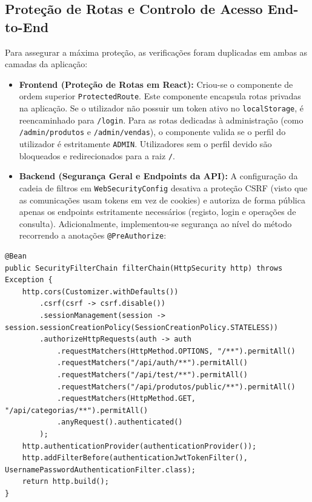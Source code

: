 \documentclass[11pt,a4paper,oneside]{report}
\begin{document}
\subsection{Proteção de Rotas e Controlo de Acesso End-to-End}
Para assegurar a máxima proteção, as verificações foram duplicadas em ambas as camadas da aplicação:
\begin{itemize}
    \item \textbf{Frontend (Proteção de Rotas em React):}
    Criou-se o componente de ordem superior \texttt{ProtectedRoute}. Este componente encapsula rotas privadas na aplicação. Se o utilizador não possuir um token ativo no \texttt{localStorage}, é reencaminhado para \texttt{/login}. 
    Para as rotas dedicadas à administração (como \texttt{/admin/produtos} e \texttt{/admin/vendas}), o componente valida se o perfil do utilizador é estritamente \texttt{ADMIN}. Utilizadores sem o perfil devido são bloqueados e redirecionados para a raiz \texttt{/}.
    
    \item \textbf{Backend (Segurança Geral e Endpoints da API):}
    A configuração da cadeia de filtros em \texttt{WebSecurityConfig} desativa a proteção CSRF (visto que as comunicações usam tokens em vez de cookies) e autoriza de forma pública apenas os endpoints estritamente necessários (registo, login e operações de consulta). Adicionalmente, implementou-se segurança ao nível do método recorrendo a anotações \texttt{@PreAuthorize}:
\end{itemize}

\begin{lstlisting}[caption={Configuração do SecurityFilterChain no Backend (WebSecurityConfig)}]
@Bean
public SecurityFilterChain filterChain(HttpSecurity http) throws Exception {
    http.cors(Customizer.withDefaults())
        .csrf(csrf -> csrf.disable())
        .sessionManagement(session -> session.sessionCreationPolicy(SessionCreationPolicy.STATELESS))
        .authorizeHttpRequests(auth -> auth
            .requestMatchers(HttpMethod.OPTIONS, "/**").permitAll()
            .requestMatchers("/api/auth/**").permitAll()
            .requestMatchers("/api/test/**").permitAll()
            .requestMatchers("/api/produtos/public/**").permitAll()
            .requestMatchers(HttpMethod.GET, "/api/categorias/**").permitAll()
            .anyRequest().authenticated()
        );
    http.authenticationProvider(authenticationProvider());
    http.addFilterBefore(authenticationJwtTokenFilter(), UsernamePasswordAuthenticationFilter.class);
    return http.build();
}
\end{lstlisting}
\end{document}
